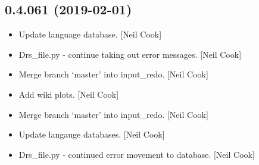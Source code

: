 \documentclass[a4paper,10pt,english]{report}
\begin{document}
\subsection{0.4.061 (2019-02-01)}
\label{\detokenize{misc/changelog:id197}}\begin{itemize}
\item {} 
Update language database. {[}Neil Cook{]}

\item {} 
Drs\_file.py - continue taking out error messages. {[}Neil Cook{]}

\item {} 
Merge branch ‘master’ into input\_redo. {[}Neil Cook{]}

\item {} 
Add wiki plots. {[}Neil Cook{]}

\item {} 
Merge branch ‘master’ into input\_redo. {[}Neil Cook{]}

\item {} 
Update langauge databases. {[}Neil Cook{]}

\item {} 
Drs\_file.py - continued error movement to database. {[}Neil Cook{]}

\end{itemize}
\end{document}
